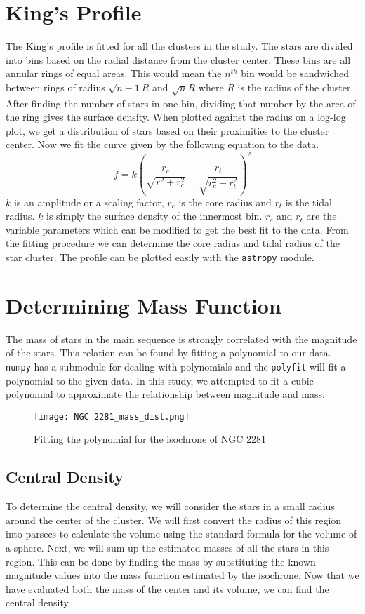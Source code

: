 \section{King's Profile}
The King's profile\citep{kingprofile} is fitted for all the clusters in the study. The stars are divided into bins based on the radial distance from the cluster center. These bins are all annular rings of equal areas. This would mean the $n^{th}$ bin would be sandwiched between rings of radius $\sqrt{n-1}R$ and $\sqrt{n}R$ where $R$ is the radius of the cluster. After finding the number of stars in one bin, dividing that number by the area of the ring gives the surface density. When plotted against the radius on a log-log plot, we get a distribution of stars based on their proximities to the cluster center. Now we fit the curve given by the following equation to the data.
$$f = k \left( \frac{r_c}{\sqrt{r^2+r_c^2}} - \frac{r_t}{\sqrt{r_c^2+r_t^2}} \right) ^2$$
$k$ is an amplitude or a scaling factor, $r_c$ is the core radius and $r_t$ is the tidal radius. $k$ is simply the surface density of the innermost bin. $r_c$ and $r_t$ are the variable parameters which can be modified to get the best fit to the data. From the fitting procedure we can determine the core radius and tidal radius of the star cluster. The profile can be plotted easily with the \lstinline{astropy} {} module.

\section{Determining Mass Function}
The mass of stars in the main sequence is strongly correlated with the magnitude of the stars. This relation can be found by fitting a polynomial to our data. \lstinline{numpy} {}has a submodule for dealing with polynomials and the \lstinline{polyfit} {}will fit a polynomial to the given data. In this study, we attempted to fit a cubic polynomial to approximate the relationship between magnitude and mass. 

\begin{figure}[h]
	\centering
	\texttt{[image: NGC 2281\_mass\_dist.png]}
	\caption{Fitting the polynomial for the isochrone of NGC 2281}
	\label{fig:im6}
\end{figure}

\subsection{Central Density}
To determine the central density, we will consider the stars in a small radius around the center of the cluster. We will first convert the radius of this region into parsecs to calculate the volume using the standard formula for the volume of a sphere. Next, we will sum up the estimated masses of all the stars in this region. This can be done by finding the mass by substituting the known magnitude values into the mass function estimated by the isochrone. Now that we have evaluated both the mass of the center and its volume, we can find the central density.

